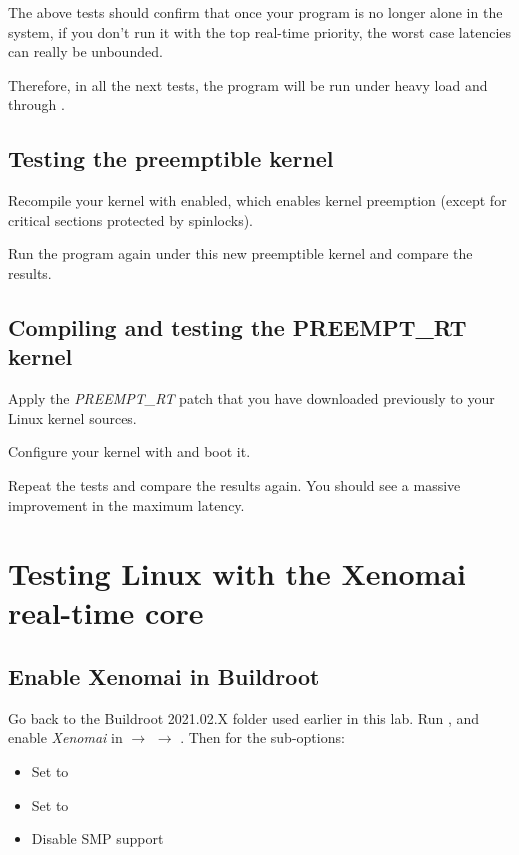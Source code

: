 The above tests should confirm that once your program is no longer
alone in the system, if you don't run it with the top real-time
priority, the worst case latencies can really be unbounded.

Therefore, in all the next tests, the program will be run under
heavy load and through .

\subsection{Testing the preemptible kernel}

Recompile your kernel with  enabled, which
enables kernel preemption (except for critical sections protected by
spinlocks).

Run the  program again under this new
preemptible kernel and compare the results.

\subsection{Compiling and testing the PREEMPT\_RT kernel}

Apply the {\em PREEMPT\_RT} patch that you have downloaded previously
to your Linux kernel sources.

Configure your kernel with  and boot it.

Repeat the tests and compare the results again. You should see a massive
improvement in the maximum latency.

\section{Testing Linux with the Xenomai real-time core}

\subsection{Enable Xenomai in Buildroot}

Go back to the Buildroot 2021.02.X folder used earlier in this lab. Run
, and enable {\em Xenomai} in  $\rightarrow$  $\rightarrow$ . Then for the sub-options:

\begin{itemize}
\item Set  to 
\item Set  to 
\item Disable SMP support
\end{itemize}

